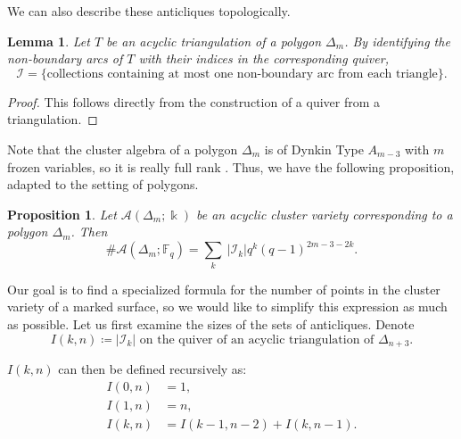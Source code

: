 \documentclass[reqno,12pt]{amsart}
\newtheorem{lemma}[thm]{Lemma}
\newtheorem{prop}[thm]{Proposition}
\theoremstyle{definition}
\theoremstyle{remark}
\theoremstyle{remark}
\numberwithin{equation}{section}
\begin{document}
We can also describe these anticliques topologically.
\begin{lemma}
	Let $T$ be an acyclic triangulation of a polygon $\Delta_m$. By identifying the non-boundary arcs of $T$ with their indices in the corresponding quiver, \[ \mathcal{I} = \{\text{collections containing at most one non-boundary arc from each triangle}\}.\]
\end{lemma}
\begin{proof}
	This follows directly from the construction of a quiver from a triangulation.
\end{proof}

Note that the cluster algebra of a polygon $\Delta_{m}$ is of Dynkin Type $A_{m-3}$ with $m$ frozen variables, so it is really full rank \cite[Section 5.1]{CGSS26}. Thus, we have the following proposition, adapted to the setting of polygons.
\begin{prop}\cite[Proposition 3.9]{LS23}
	Let $\mathcal{A}(\Delta_m; \Bbbk)$ be an acyclic cluster variety corresponding to a polygon $\Delta_m$. Then \[ \#\mathcal{A}(\Delta_m ;\mathbb{F}_q) = \sum_{k} ~\lvert \mathcal{I}_k \rvert q^k (q-1)^{2m-3-2k}.\]
\end{prop}

Our goal is to find a specialized formula for the number of points in the cluster variety of a marked surface, so we would like to simplify this expression as much as possible. Let us first examine the sizes of the sets of anticliques. Denote 
\[ I(k,n) \coloneqq \lvert \mathcal{I}_k \rvert \text{ on the quiver of an acyclic triangulation of $\Delta_{n+3}$.} \]

	$I(k,n)$ can then be defined recursively as:
	\begin{align*}
		I(0,n) &= 1, \\
		I(1,n) &= n, \\
		I(k,n) &= I(k-1, n-2) + I(k,n-1).
	\end{align*}
\end{document}
